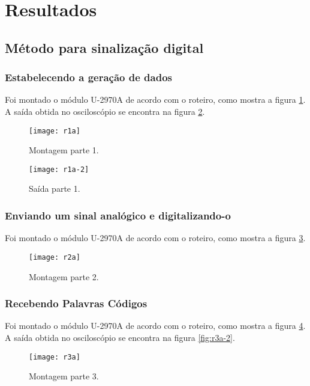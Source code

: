 \newpage
\section{Resultados}

\subsection{Método para sinalização digital}
\subsubsection{Estabelecendo a geração de dados}
    Foi montado o módulo U-2970A de acordo com o roteiro, como mostra a figura \ref{fig:r1a}.
    A saída obtida no osciloscópio se encontra na figura \ref{fig:r1a-2}.
    
            \begin{figure}[H]
                \centering
                \caption{Montagem parte 1.}
                \texttt{[image: r1a]}
                
                \label{fig:r1a}
            \end{figure}
            
            \begin{figure}[H]
                \centering
                \caption{Saída parte 1.}
                \texttt{[image: r1a-2]}
                
                \label{fig:r1a-2}
            \end{figure}

    \subsubsection{Enviando um sinal analógico e digitalizando-o}
    Foi montado o módulo U-2970A de acordo com o roteiro, como mostra a figura \ref{fig:r2a}.
            \begin{figure}[H]
                \centering
                \caption{Montagem parte 2.}
                \texttt{[image: r2a]}
                
                \label{fig:r2a}
            \end{figure}

            
    \subsubsection{Recebendo Palavras Códigos}
     Foi montado o módulo U-2970A de acordo com o roteiro, como mostra a figura \ref{fig:r3a}.
     A saída obtida no osciloscópio se encontra na figura \ref{fig:r3a-2}.
     \begin{figure}[H]
         \centering
         \caption{Montagem parte 3.}
         \texttt{[image: r3a]}
         
         \label{fig:r3a}
        \end{figure}
            
